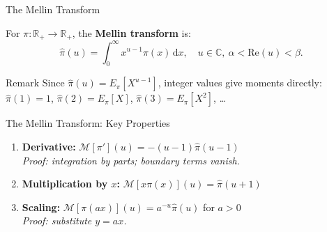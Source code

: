 \documentclass[aspectratio=169]{beamer}
\begin{document}
\begin{frame}{The Mellin Transform}

  \begin{definition}
    For $\pi:\mathbb{R}_+\to\mathbb{R}_+$, the \textbf{Mellin
    transform} is:
    \[
      \hat{\pi}(u) = \int_0^\infty x^{u-1}\pi(x)\,\mathrm{d}x,
      \quad u\in\mathbb{C},\ \alpha < \mathrm{Re}(u) < \beta.
    \]
  \end{definition}

  \bigskip
  \begin{block}{Remark}
    Since $\hat{\pi}(u) = E_\pi[X^{u-1}]$, integer values give
    moments directly: $\hat{\pi}(1)=1$, $\hat{\pi}(2)=E_\pi[X]$,
    $\hat{\pi}(3)=E_\pi[X^2]$, \ldots
  \end{block}

\end{frame}

\begin{frame}{The Mellin Transform: Key Properties}

  \begin{enumerate}
    \setlength\itemsep{12pt}
    \item \textbf{Derivative:}
          $\mathcal{M}[\pi'](u) = -(u-1)\hat{\pi}(u-1)$\\
          \textit{Proof: integration by parts; boundary terms
          vanish.}

    \item \textbf{Multiplication by $x$:}
          $\mathcal{M}[x\pi(x)](u) = \hat{\pi}(u+1)$

    \item \textbf{Scaling:}
          $\mathcal{M}[\pi(ax)](u) = a^{-u}\hat{\pi}(u)$
          \quad for $a > 0$\\
          \textit{Proof: substitute $y = ax$.}
  \end{enumerate}

\end{frame}
\end{document}

